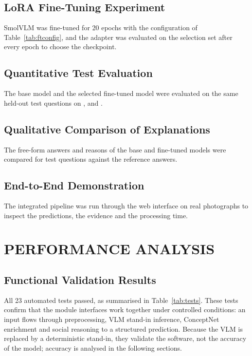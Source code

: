 \subsection{LoRA Fine-Tuning Experiment}
SmolVLM was fine-tuned for 20 epochs with the configuration of Table~\ref{tab:ftconfig}, and the adapter was evaluated on the selection set after every epoch to choose the checkpoint.

\subsection{Quantitative Test Evaluation}
The base model and the selected fine-tuned model were evaluated on the same held-out test questions on \QtoA, \QAtoR{} and \QtoAR.

\subsection{Qualitative Comparison of Explanations}
The free-form answers and reasons of the base and fine-tuned models were compared for test questions against the reference answers.

\subsection{End-to-End Demonstration}
The integrated pipeline was run through the web interface on real photographs to inspect the predictions, the evidence and the processing time.

\section{PERFORMANCE ANALYSIS}

\subsection{Functional Validation Results}
All 23 automated tests passed, as summarised in Table~\ref{tab:tests}. These tests confirm that the module interfaces work together under controlled conditions: an input flows through preprocessing, VLM stand-in inference, ConceptNet enrichment and social reasoning to a structured prediction. Because the VLM is replaced by a deterministic stand-in, they validate the software, not the accuracy of the model; accuracy is analysed in the following sections.

